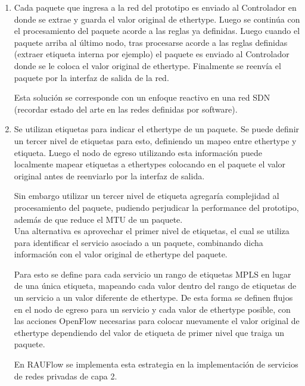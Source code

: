 \begin{enumerate}
\item Cada paquete que ingresa a la red del prototipo es enviado al Controlador en donde se extrae y guarda el valor original de ethertype. Luego se contin\'ua con el procesamiento del paquete acorde a las reglas ya definidas. Luego cuando el paquete arriba al \'ultimo nodo, tras procesarse acorde a las reglas definidas (extraer etiqueta interna por ejemplo) el paquete es enviado al Controlador donde se le coloca el valor original de ethertype. Finalmente se reenv\'ia el paquete por la interfaz de salida de la red.

Esta soluci\'on se corresponde con un enfoque reactivo en una red SDN (recordar estado del arte en las redes definidas por software).

\item Se utilizan etiquetas para indicar el ethertype de un paquete. Se puede definir un tercer nivel de etiquetas para esto, definiendo un mapeo entre ethertype y etiqueta. Luego el nodo de egreso utilizando esta informaci\'on puede localmente mapear etiquetas a ethertypes colocando en el paquete el valor original antes de reenviarlo por la interfaz de salida. 

Sin embargo utilizar un tercer nivel de etiqueta agregar\'ia complejidad al procesamiento del paquete, pudiendo perjudicar la performance del prototipo, adem\'as de que reduce el MTU de un paquete.\\ 

Una alternativa es aprovechar el primer nivel de etiquetas, el cual se utiliza para identificar el servicio asociado a un paquete, combinando dicha informaci\'on con el valor original de ethertype del paquete.

Para esto se define para cada servicio un rango de etiquetas MPLS en lugar de una \'unica etiqueta, mapeando cada valor dentro del rango de etiquetas de un servicio a un valor diferente de ethertype. De esta forma se definen flujos en el nodo de egreso para un servicio y cada valor de ethertype posible, con las acciones OpenFlow necesarias para colocar nuevamente el valor original de ethertype dependiendo del valor de etiqueta de primer nivel que traiga un paquete.   


En RAUFlow se implementa esta estrategia en la implementaci\'on de servicios de redes privadas de capa 2. 

\end{enumerate} 

